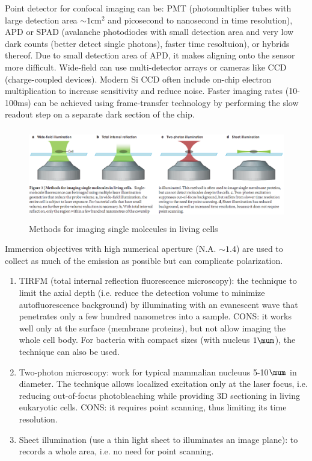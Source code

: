 Point detector for confocal imaging can be: PMT (photomultiplier tubes with
large detection area $\sim 1$cm$^2$ and picosecond to nanosecond in time
resolution), APD or SPAD (avalanche photodiodes with small detection area and
very low dark counts (better detect single photons), faster time resoltuion), or
hybrids thereof. Due to small detection area of APD, it makes aligning onto the
sensor more difficult. Wide-field can use multi-detector arrays or cameras like
CCD (charge-coupled devices). Modern Si CCD often include on-chip electron
multiplication to increase sensitivity and reduce noise. Faster imaging rates
(10-100ms) can be achieved using frame-transfer technology by performing the
slow readout step on a separate dark section of the chip. 

 \begin{figure}[hbt]
  \centerline{\includegraphics[height=4cm,
    angle=0]{./images/single_molecule_imaging.eps}}
\caption{Methods for imaging single molecules in living cells}
\label{fig:single_molecule_imaging}
\end{figure}

Immersion objectives with high numerical aperture (N.A. $\sim 1.4$) are used to
collect as much of the emission as possible but can complicate polarization. 

\begin{enumerate}
  \item TIRFM (total internal reflection fluorescence microscopy): the technique
  to limit the axial depth (i.e. reduce the detection volume to minimize
  autofluorescence background) by illuminating with an evanescent wave that
  penetrates only a few hundred nanometres into a sample. CONS: it works well
  only at the surface (membrane proteins), but not allow imaging the whole cell
  body. For bacteria with compact sizes (with nucleus $1\mum$), the technique
  can also be used.
  \item Two-photon microscopy: work for typical mammalian nucleuus 5-10$\mum$ in
  diameter. The technique allows localized excitation only at the laser focus,
  i.e. reducing out-of-focus photobleaching while providing 3D sectioning in
  living eukaryotic cells. CONS: it requires point scanning, thus limiting its
  time resolution.
  \item Sheet illumination (use a thin light sheet to illuminates an image
  plane): to records a whole area, i.e. no need for point scanning. 
\end{enumerate}




